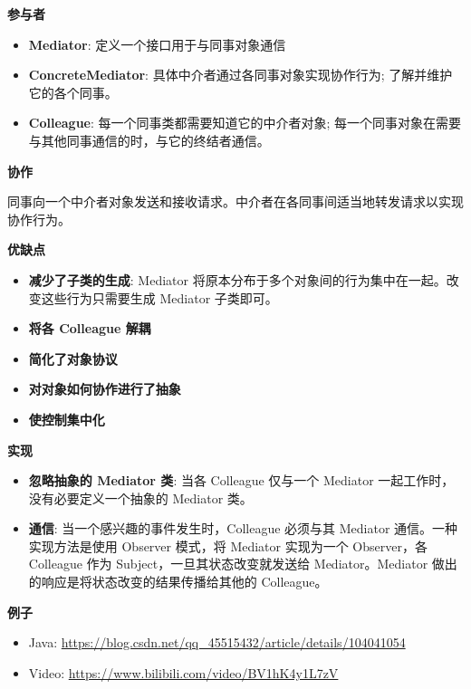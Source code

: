 \noindent\textbf{参与者}

\begin{itemize}
    \item \textbf{Mediator}: 定义一个接口用于与同事对象通信
    \item \textbf{ConcreteMediator}: 具体中介者通过各同事对象实现协作行为; 了解并维护它的各个同事。
    \item \textbf{Colleague}: 每一个同事类都需要知道它的中介者对象; 每一个同事对象在需要与其他同事通信的时，与它的终结者通信。
\end{itemize}

\noindent\textbf{协作}

同事向一个中介者对象发送和接收请求。中介者在各同事间适当地转发请求以实现协作行为。

\noindent\textbf{优缺点}

\begin{itemize}
    \item \textbf{减少了子类的生成}: Mediator 将原本分布于多个对象间的行为集中在一起。改变这些行为只需要生成 Mediator 子类即可。
    \item \textbf{将各 Colleague 解耦}
    \item \textbf{简化了对象协议}
    \item \textbf{对对象如何协作进行了抽象}
    \item \textbf{使控制集中化}
\end{itemize}

\noindent\textbf{实现}

\begin{itemize}
    \item \textbf{忽略抽象的 Mediator 类}: 当各 Colleague 仅与一个 Mediator 一起工作时，没有必要定义一个抽象的 Mediator 类。
    \item \textbf{通信}: 当一个感兴趣的事件发生时，Colleague 必须与其 Mediator 通信。一种实现方法是使用 Observer 模式，将 Mediator 实现为一个 Observer，各 Colleague 作为 Subject，一旦其状态改变就发送给 Mediator。Mediator 做出的响应是将状态改变的结果传播给其他的 Colleague。
\end{itemize}

\noindent\textbf{例子}

\begin{itemize}
    \item Java: \url{https://blog.csdn.net/qq_45515432/article/details/104041054}
    \item Video: \url{https://www.bilibili.com/video/BV1hK4y1L7zV}
\end{itemize}



\newpage